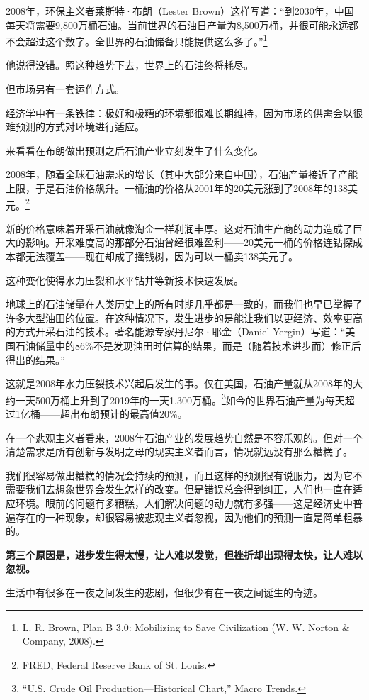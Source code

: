 2008年，环保主义者莱斯特·布朗（Lester Brown）这样写道：“到2030年，中国每天将需要9,800万桶石油。当前世界的石油日产量为8,500万桶，并很可能永远都不会超过这个数字。全世界的石油储备只能提供这么多了。”\footnote{L. R. Brown, Plan B 3.0: Mobilizing to Save Civilization (W. W. Norton \& Company, 2008).}

他说得没错。照这种趋势下去，世界上的石油终将耗尽。

但市场另有一套运作方式。

经济学中有一条铁律：极好和极糟的环境都很难长期维持，因为市场的供需会以很难预测的方式对环境进行适应。

来看看在布朗做出预测之后石油产业立刻发生了什么变化。

2008年，随着全球石油需求的增长（其中大部分来自中国），石油产量接近了产能上限，于是石油价格飙升。一桶油的价格从2001年的20美元涨到了2008年的138美元。\footnote{FRED, Federal Reserve Bank of St. Louis.}

新的价格意味着开采石油就像淘金一样利润丰厚。这对石油生产商的动力造成了巨大的影响。开采难度高的那部分石油曾经很难盈利——20美元一桶的价格连钻探成本都无法覆盖——现在却成了摇钱树，因为可以一桶卖138美元了。

这种变化使得水力压裂和水平钻井等新技术快速发展。

地球上的石油储量在人类历史上的所有时期几乎都是一致的，而我们也早已掌握了许多大型油田的位置。在这种情况下，发生进步的是能让我们以更经济、效率更高的方式开采石油的技术。著名能源专家丹尼尔·耶金（Daniel Yergin）写道：“美国石油储量中的86\%不是发现油田时估算的结果，而是（随着技术进步而）修正后得出的结果。”

这就是2008年水力压裂技术兴起后发生的事。仅在美国，石油产量就从2008年的大约一天500万桶上升到了2019年的一天1,300万桶。\footnote{“U.S. Crude Oil Production—Historical Chart,” Macro Trends.}如今的世界石油产量为每天超过1亿桶——超出布朗预计的最高值20\%。

在一个悲观主义者看来，2008年石油产业的发展趋势自然是不容乐观的。但对一个清楚需求是所有创新与发明之母的现实主义者而言，情况就远没有那么糟糕了。

我们很容易做出糟糕的情况会持续的预测，而且这样的预测很有说服力，因为它不需要我们去想象世界会发生怎样的改变。但是错误总会得到纠正，人们也一直在适应环境。眼前的问题有多糟糕，人们解决问题的动力就有多强——这是经济史中普遍存在的一种现象，却很容易被悲观主义者忽视，因为他们的预测一直是简单粗暴的。

\textbf{第三个原因是，进步发生得太慢，让人难以发觉，但挫折却出现得太快，让人难以忽视。}

生活中有很多在一夜之间发生的悲剧，但很少有在一夜之间诞生的奇迹。

